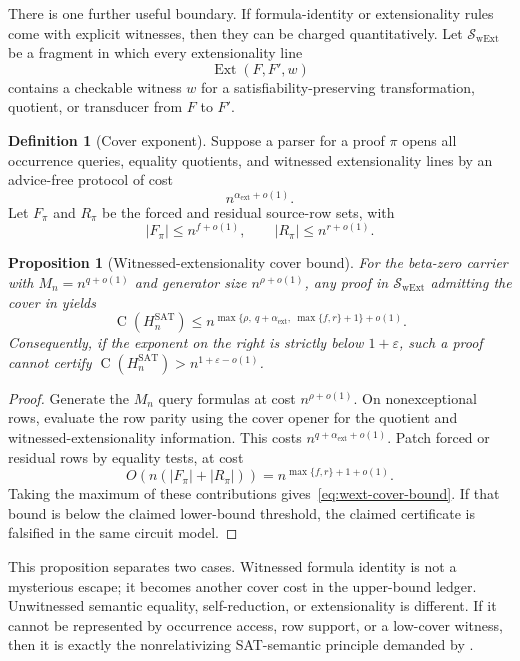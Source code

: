 \documentclass[11pt]{article}
\newtheorem{proposition}[theorem]{Proposition}
\theoremstyle{definition}
\newtheorem{definition}[theorem]{Definition}
\newcommand{\Ckt}{\operatorname{C}}
\newcommand{\SAT}{\mathrm{SAT}}
\newcommand{\eps}{\varepsilon}
\newcommand{\Hsat}{H_n^{\SAT}}
\newcommand{\Ext}{\operatorname{Ext}}
\begin{document}
There is one further useful boundary. If formula-identity or extensionality rules come with explicit witnesses, then they can be charged quantitatively. Let $\mathcal{S}_{\mathrm{wExt}}$ be a fragment in which every extensionality line
\[
  \Ext(F,F',w)
\]
contains a checkable witness $w$ for a satisfiability-preserving transformation, quotient, or transducer from $F$ to $F'$.

\begin{definition}[Cover exponent]\label{def:cover-exponent}
Suppose a parser for a proof $\pi$ opens all occurrence queries, equality quotients, and witnessed extensionality lines by an advice-free protocol of cost
\[
  n^{\alpha_{\mathrm{ext}}+o(1)}.
\]
Let $F_\pi$ and $R_\pi$ be the forced and residual source-row sets, with
\[
  |F_\pi|\le n^{f+o(1)},\qquad |R_\pi|\le n^{r+o(1)}.
\]
\end{definition}

\begin{proposition}[Witnessed-extensionality cover bound]\label{prop:wext-cover}
For the beta-zero carrier with $M_n=n^{q+o(1)}$ and generator size $n^{\rho+o(1)}$, any proof in $\mathcal{S}_{\mathrm{wExt}}$ admitting the cover in  yields
\begin{equation}\label{eq:wext-cover-bound}
  \Ckt(\Hsat)
  \le
  n^{\max\{\rho,\ q+\alpha_{\mathrm{ext}},\ \max\{f,r\}+1\}+o(1)} .
\end{equation}
Consequently, if the exponent on the right is strictly below $1+\eps$, such a proof cannot certify $\Ckt(\Hsat)>n^{1+\eps-o(1)}$.
\end{proposition}

\begin{proof}
Generate the $M_n$ query formulas at cost $n^{\rho+o(1)}$. On nonexceptional rows, evaluate the row parity using the cover opener for the quotient and witnessed-extensionality information. This costs $n^{q+\alpha_{\mathrm{ext}}+o(1)}$. Patch forced or residual rows by equality tests, at cost
\[
  O\!\left(n(|F_\pi|+|R_\pi|)\right)
  =
  n^{\max\{f,r\}+1+o(1)} .
\]
Taking the maximum of these contributions gives~\eqref{eq:wext-cover-bound}. If that bound is below the claimed lower-bound threshold, the claimed certificate is falsified in the same circuit model.
\end{proof}

This proposition separates two cases. Witnessed formula identity is not a mysterious escape; it becomes another cover cost in the upper-bound ledger. Unwitnessed semantic equality, self-reduction, or extensionality is different. If it cannot be represented by occurrence access, row support, or a low-cover witness, then it is exactly the nonrelativizing SAT-semantic principle demanded by .
\end{document}
